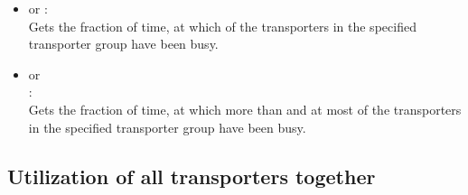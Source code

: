 \begin{itemize}
\item
{} or :\\
Gets the fraction of time, at which  of the transporters in the specified transporter group have been busy.
  
\item
{} or\\
:\\
Gets the fraction of time, at which more than  and at most  of the transporters in the specified transporter group have been busy.

\end{itemize}



\subsection{Utilization of all transporters together}

